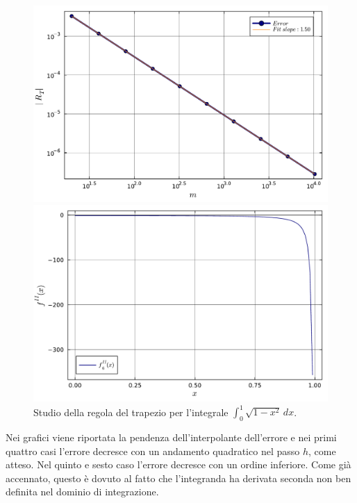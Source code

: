 \documentclass[letterpaper, 12pt]{article}
\begin{document}
\begin{figure}[!ht]
    \centering
    \begin{minipage}[b]{0.47\textwidth}
        \includegraphics[width=\textwidth]{5126.pdf}
    \end{minipage}
    \hspace{0.5cm}
    \begin{minipage}[b]{0.47\textwidth}
        \includegraphics[width=\textwidth]{5126_2.pdf}
    \end{minipage}
    \caption{Studio della regola del trapezio per l'integrale $\int_0^1 \sqrt{1-x^2}\, dx$.}
    \label{fig:es5_1_2_6}
\end{figure}

Nei grafici viene riportata la pendenza dell'interpolante dell'errore e nei primi quattro casi l'errore 
decresce con un andamento quadratico nel passo $h$, come atteso. Nel quinto e sesto caso l'errore decresce 
con un ordine inferiore. Come già accennato, questo è dovuto al fatto che l'integranda ha derivata seconda 
non ben definita nel dominio di integrazione.
\end{document}
